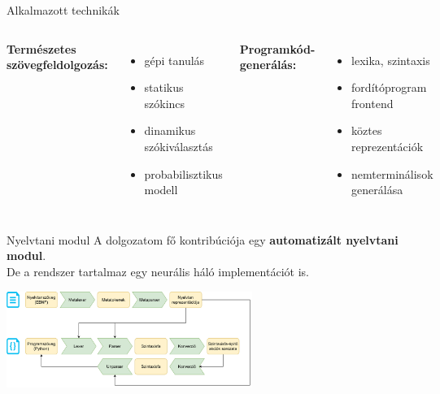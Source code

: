\documentclass[10pt]{beamer}
\begin{document}
\begin{frame}{Alkalmazott technikák}
  \begin{columns}[T]
    \textbf{Természetes szövegfeldolgozás:}
    \vspace{0.2cm}
    \begin{itemize}
      \item gépi tanulás
      \item statikus szókincs
      \item dinamikus szókiválasztás
      \item probabilisztikus modell
    \end{itemize}
    \textbf{Programkód-generálás:}
    \vspace{0.2cm}
    \begin{itemize}
      \item lexika, szintaxis
      \item fordítóprogram frontend
      \item köztes reprezentációk
      \item nemterminálisok generálása
    \end{itemize}
  \end{columns}
\end{frame}

\begin{frame}{Nyelvtani modul}
  A dolgozatom fő kontribúciója egy \textbf{automatizált nyelvtani modul}.\\
  De a rendszer tartalmaz egy neurális háló implementációt is.
  \begin{center}
    \includegraphics[width=8cm]{grammar.png}
  \end{center}
\end{frame}
\end{document}
